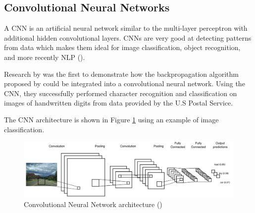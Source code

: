 

\subsection{Convolutional Neural Networks}


A \acrfull{CNN} is an artificial neural network similar to the multi-layer perceptron with additional hidden convolutional layers. \acrshort{CNN}s are very good at detecting patterns from data which makes them ideal for image classification, object recognition, and more recently \acrfull{NLP} (\cite{young_cnns_recent_2018}).

Research by \cite{lecun_backprop_cnn_1989} was the first to demonstrate how the backpropagation algorithm proposed by \cite{rumelhart_learning_1986} could be integrated into a convolutional neural network.
Using the \acrshort{CNN}, they successfully performed character recognition and classification on images of handwritten digits from data provided by the U.S Postal Service.

The \acrshort{CNN} architecture is shown in Figure \ref{fig:cnn_1} using an example of image classification.

\begin{figure}[ht!]
\centering
\includegraphics[width=1\textwidth]{media/literature/machine_learning/ml_cnn_1.png}
\caption[Diagram of a convolutional neural network architecture]{Convolutional Neural Network architecture (\cite{lopez_deep_2017})}
\label{fig:cnn_1}
\end{figure}


